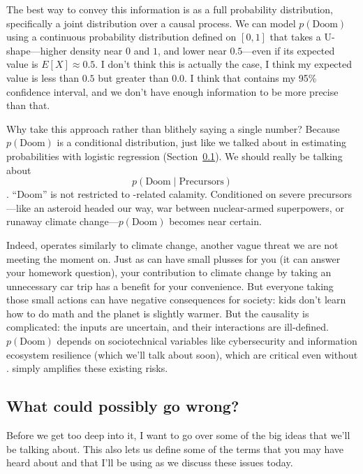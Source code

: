 
The best way to convey this information is as a full probability
distribution, specifically a joint distribution over a causal
process. We can model $p(\text{Doom})$ using a continuous probability
distribution defined on $[0, 1]$ that takes a U-shape—higher density
near $0$ and $1$, and lower near $0.5$—even if its expected value is
$E[X] \approx 0.5$.
%
I don't think this is actually the case, I think my expected value is
less than $0.5$ but greater than $0.0$.  I think that contains my 95\%
confidence interval, and we don't have enough information to be more
precise than that.

Why take this approach rather than blithely saying a single number?
Because $p(\text{Doom})$ is a conditional distribution, just like we
talked about in estimating probabilities with logistic regression
(Section~\ref{}).
%
We should really be talking about
$$p(\text{Doom} \mid \text{Precursors})$$.
%
``Doom'' is not restricted to -related calamity.
%
Conditioned on severe precursors—like an asteroid headed our way, war
between nuclear-armed superpowers, or runaway climate
change—$p(\text{Doom})$ becomes near certain.

Indeed,  operates similarly to climate change, another vague
threat we are not meeting the moment on.
%
Just as  can have small plusses for you (it can answer your
homework question), your contribution to climate change by taking an
unnecessary car trip has a benefit for your convenience.
%
But everyone taking those small actions can have negative consequences
for society: kids don't learn how to do math and the planet is
slightly warmer.
%
But the causality is complicated: the inputs are uncertain, and their
interactions are ill-defined.
%
$p(\text{Doom})$ depends on sociotechnical variables like
cybersecurity and information ecosystem resilience (which we'll talk
about soon), which are critical even without .  simply
amplifies these existing risks.

\subsection{What could possibly go wrong?}

Before we get too deep into it, I want to go over some of the big
ideas that we'll be talking about. This also lets us define some of
the terms that you may have heard about and that I'll be using as we
discuss these issues today.

